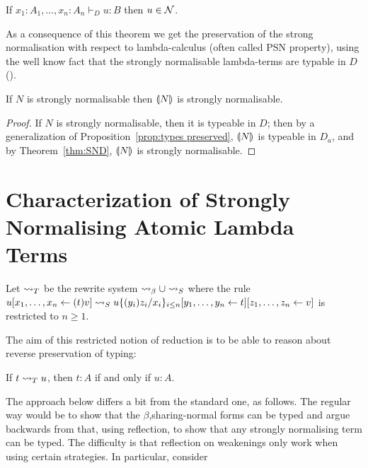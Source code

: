 \documentclass[orivec]{llncs}
\begin{document}
\begin{ALtheorem}\label{thm:SND}
If $x_1:A_1,\dots, x_n:A_n \vdash_D u:B$ then $u \in \mathcal{N}$.
\end{ALtheorem}

\noindent
As a consequence of this theorem we get the preservation of the strong normalisation with respect to lambda-calculus (often called PSN property), using the well know fact that the strongly normalisable lambda-terms are typable in $D$ (\cite{Coppo-DezaniCiancaglini-1980,Pottinger-1980,Krivine-1993}).

\begin{ALtheorem}[PSN]
If $N$ is strongly normalisable then ${\llparenthesis{N}\rrparenthesis_{{}}}$ is strongly normalisable.
\end{ALtheorem}

\begin{proof}
If $N$ is strongly normalisable, then it is typeable in $D$; then by a generalization of Proposition~\ref{prop:types preserved}, ${\llparenthesis{N}\rrparenthesis_{{}}}$ is typeable in $D_a$, and by Theorem~\ref{thm:SND}, ${\llparenthesis{N}\rrparenthesis_{{}}}$ is strongly normalisable.
\end{proof}

\section{Characterization of Strongly Normalising Atomic Lambda Terms}

\begin{ALdefinition}
Let $\ALtype$ be the rewrite system $\ALbeta\cup\ALnotbeta$ where the rule $u\share x{(t)v}\ALnotbeta u\{(y_i)z_i/x_i\}_{i\leq n}\share yt\share zv$ is restricted to $n\geq 1$.
\end{ALdefinition}

The aim of this restricted notion of reduction is to be able to reason about reverse preservation of typing:

\begin{ALlemma}\label{lem:rev-preserv-types}
If $t\ALtype u$, then $t:A$ if and only if $u:A$.
\end{ALlemma}

The approach below differs a bit from the standard one, as follows. The regular way would be to show that the $\beta$,sharing-normal forms can be typed and argue backwards from that, using reflection, to show that any strongly normalising term can be typed. The difficulty is that reflection on weakenings only work when using certain strategies. In particular, consider
\end{document}
